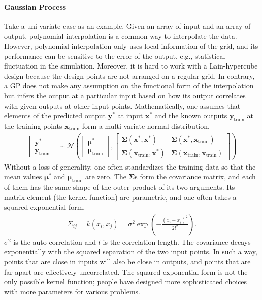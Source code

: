 \paragraph{Gaussian Process} Take a uni-variate case as an example. Given an array of input and an array of output, polynomial interpolation is a common way to interpolate the data.
However, polynomial interpolation only uses local information of the grid, and its performance can be sensitive to the error of the output, e.g., statistical fluctuation in the simulation.
Moreover, it is hard to work with a Lain-hypercube design because the design points are not arranged on a regular grid.
In contrary, a GP does not make any assumption on the functional form of the interpolation but infers the output at a particular input based on how its output correlates with given outputs at other input points.
Mathematically, one assumes that elements of the predicted output $\mathbf{y}^*$ at input $\mathbf{x^*}$ and the known outputs $\mathbf{y}_{\textrm{train}}$ at the training points $\mathbf{x}_{\textrm{train}}$ form a multi-variate normal distribution,
\begin{eqnarray}
\begin{bmatrix}
\mathbf{y}^* \\
\mathbf{y}_{\textrm{train}}
\end{bmatrix}
\sim
\mathcal{N}\left(
\begin{bmatrix}
\mathbf{\mu}^* \\
\mathbf{\mu}_{\textrm{train}}
\end{bmatrix},
\begin{bmatrix}
\mathbf{\Sigma}(\mathbf{x}^*, \mathbf{x}^*)& \mathbf{\Sigma}(\mathbf{x}^*, \mathbf{x}_{\textrm{train}}) \\
\mathbf{\Sigma}(\mathbf{x}_{\textrm{train}}, \mathbf{x}^*)& \mathbf{\Sigma}(\mathbf{x}_{\textrm{train}}, \mathbf{x}_{\textrm{train}})
\end{bmatrix}
\right)
\end{eqnarray}
Without a loss of generality, one often standardizes the training data so that the mean values $\mathbf{\mu}^*$ and $\mathbf{\mu}_{\textrm{train}}$ are zero.
The $\mathbf{\Sigma}$s form the covariance matrix, and each of them has the same shape of the outer product of its two arguments.
Its matrix-element (the kernel function) are parametric, and one often takes a squared exponential form,
\begin{eqnarray}
\Sigma_{ij} = k(x_i, x_j) = \sigma^2 \exp\left(-\frac{(x_i-x_j)^2}{2l^2}\right).
\end{eqnarray}
$\sigma^2$ is the auto correlation and $l$ is the correlation length.
The covariance decays exponentially with the squared separation of the two input points.
In such a way, points that are close in inputs will also be close in outputs, and points that are far apart are effectively uncorrelated.
The squared exponential form is not the only possible kernel function; people have designed more sophisticated choices with more parameters for various problems. 

